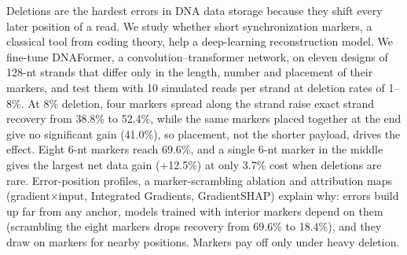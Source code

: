 Deletions are the hardest errors in DNA data storage because they shift every later position of a read. We study
whether short synchronization markers, a classical tool from coding theory, help a deep-learning reconstruction model.
We fine-tune DNAFormer, a convolution--transformer network, on eleven designs of 128-nt strands that differ only in the
length, number and placement of their markers, and test them with 10 simulated reads per strand at deletion rates of
1--8\%. At 8\% deletion, four markers spread along the strand raise exact strand recovery from 38.8\% to 52.4\%, while the
same markers placed together at the end give no significant gain (41.0\%), so placement, not the shorter payload, drives
the effect. Eight 6-nt markers reach 69.6\%, and a single 6-nt marker in the middle gives the largest net data gain
(+12.5\%) at only 3.7\% cost when deletions are rare. Error-position profiles, a marker-scrambling ablation and
attribution maps (gradient$\times$input, Integrated Gradients, GradientSHAP) explain why: errors build up far from any
anchor, models trained with interior markers depend on them (scrambling the eight markers drops recovery from 69.6\%
to 18.4\%), and they draw on markers for nearby positions. Markers pay off only under heavy deletion.
